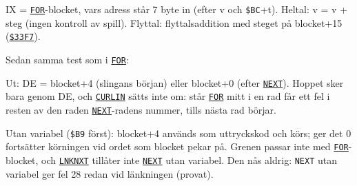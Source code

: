 \begin{Listing}
\Gap
{}
\Gap
{}
\begin{Note}\par\noindent IX = \hyperlink{l:FOR}{\texttt{FOR}}-blocket, vars adress står 7 byte in (efter v och \texttt{\$BC}+t). Heltal: v = v + steg (ingen kontroll av spill). Flyttal: flyttalsaddition med steget på blocket+15 (\hyperlink{a:33F7}{\texttt{\$33F7}}).\par
\par\noindent Sedan samma test som i \hyperlink{l:FOR}{\texttt{FOR}}:\par
\begin{Verb}
\end{Verb}
\par\noindent Ut: DE = blocket+4 (slingans början) eller blocket+0 (efter \hyperlink{l:NEXT}{\texttt{NEXT}}). Hoppet sker bara genom DE, och \hyperlink{v:CURLIN}{\texttt{CURLIN}} sätts inte om: står \hyperlink{l:FOR}{\texttt{FOR}} mitt i en rad får ett fel i resten av den raden \hyperlink{l:NEXT}{\texttt{NEXT}}-radens nummer, tills nästa rad börjar.\par\end{Note}
\Gap
\begin{Cmt}\par\noindent Utan variabel (\texttt{\$B9} först): blocket+4 används som uttryckskod och körs; ger det 0 fortsätter körningen vid ordet som blocket pekar på. Grenen passar inte med \hyperlink{l:FOR}{\texttt{FOR}}-blocket, och \hyperlink{l:LNKNXT}{\texttt{LNKNXT}} tillåter inte \hyperlink{l:NEXT}{\texttt{NEXT}} utan variabel. Den nås aldrig: \texttt{NEXT} utan variabel ger fel 28 redan vid länkningen (provat).\par\end{Cmt}

\end{Listing}
